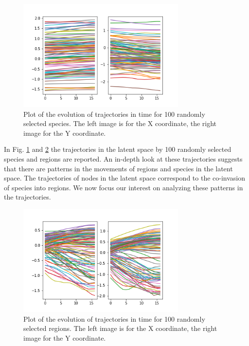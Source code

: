 \documentclass[mscthesis]{usiinfthesis}
\begin{document}
\begin{figure}[H]
    \centering
    \includegraphics[width=0.75\textwidth]{trajectories_species.png}
    \caption{Plot of the evolution of trajectories in time for 100 randomly selected species. The left image is for the X coordinate, the right image for the Y coordinate.}
    \label{fig:trajectories_species}
\end{figure}

In Fig. \ref{fig:trajectories_species} and \ref{fig:trajectories_region} the trajectories in the latent space by 100 randomly selected species and regions are reported. An in-depth look at these trajectories suggests that there are patterns in the movements of regions and species in the latent space. The trajectories of nodes in the latent space correspond to the co-invasion of species into regions. We now focus our interest on analyzing these patterns in the trajectories. 


\begin{figure}[ht]
    \centering
    \includegraphics[width=0.75\textwidth]{trajectories_region.png}
    \caption{Plot of the evolution of trajectories in time for 100 randomly selected regions. The left image is for the X coordinate, the right image for the Y coordinate.}
    \label{fig:trajectories_region}
\end{figure}
\end{document}
